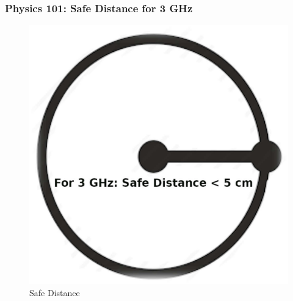\documentclass[aspectratio=169, xcolor=table, notheorems, hyperref={pdfpagelabels=false}]{beamer}
\begin{document}
\begin{frame}
\frametitle{Physics 101: Safe Distance for 3 GHz}
\begin{figure}
\includegraphics[width=0.45\linewidth]{os-circle}
\caption{Safe Distance}
\end{figure}
\end{frame}
\end{document}
